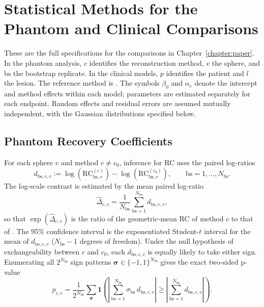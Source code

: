 \chapter{Statistical Methods for the Phantom and Clinical Comparisons}
\label{app:90y_statistical_models}

These are the full specifications for the comparisons in Chapter~\ref{chapter:paper}. In the phantom analysis, $c$ identifies the reconstruction method, $v$ the sphere, and $\mathrm{bs}$ the bootstrap replicate. In the clinical models, $p$ identifies the patient and $l$ the lesion. The reference method is \wdtnv. The symbols $\beta_0$ and $\alpha_c$ denote the intercept and method effects within each model; parameters are estimated separately for each endpoint. Random effects and residual errors are assumed mutually independent, with the Gaussian distributions specified below.

\section{Phantom Recovery Coefficients}

For each sphere $v$ and method $c\neq c_0$, inference for RC uses the paired log-ratios
\begin{equation}
d_{\mathrm{bs},c,v} := \log\!\left(\mathrm{RC}^{(c)}_{\mathrm{bs},v}\right)-\log\!\left(\mathrm{RC}^{(c_0)}_{\mathrm{bs},v}\right),
\qquad \mathrm{bs}=1,\ldots,N_{\mathrm{bs}}.
\end{equation}
The log-scale contrast is estimated by the mean paired log-ratio
\begin{equation}
\widehat{\Delta}_{c,v} = \frac{1}{N_{\mathrm{bs}}}\sum_{\mathrm{bs}=1}^{N_{\mathrm{bs}}} d_{\mathrm{bs},c,v},
\end{equation}
so that $\exp(\widehat{\Delta}_{c,v})$ is the ratio of the geometric-mean RC of method $c$ to that of \wdtnv. The 95\% confidence interval is the exponentiated Student-$t$ interval for the mean of $d_{\mathrm{bs},c,v}$ ($N_{\mathrm{bs}}-1$ degrees of freedom). Under the null hypothesis of exchangeability between $c$ and $c_0$, each $d_{\mathrm{bs},c,v}$ is equally likely to take either sign. Enumerating all $2^{N_{\mathrm{bs}}}$ sign patterns $\bm{\sigma}\in\{-1,1\}^{N_{\mathrm{bs}}}$ gives the exact two-sided p-value
\begin{equation}
p_{c,v} = \frac{1}{2^{N_{\mathrm{bs}}}}\sum_{\bm{\sigma}} \mathbf{1}\!\left(\left|\sum_{\mathrm{bs}=1}^{N_{\mathrm{bs}}}\sigma_{\mathrm{bs}}\, d_{\mathrm{bs},c,v}\right| \ge \left|\sum_{\mathrm{bs}=1}^{N_{\mathrm{bs}}} d_{\mathrm{bs},c,v}\right|\right).
\end{equation}

